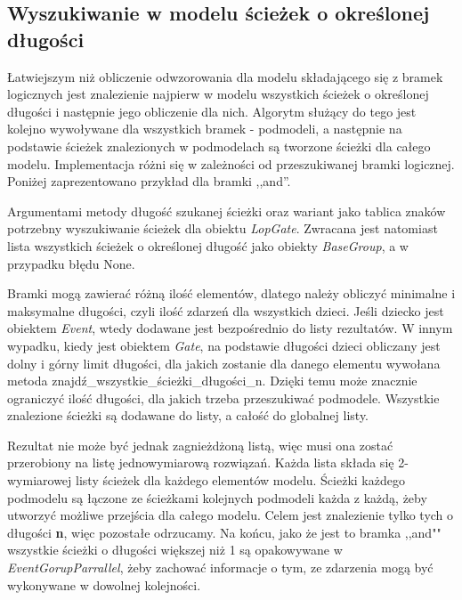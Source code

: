 \subsection{Wyszukiwanie w modelu ścieżek o określonej długości}

Łatwiejszym niż obliczenie odwzorowania dla modelu składającego się z bramek logicznych jest znalezienie najpierw w modelu wszystkich ścieżek o określonej długości i następnie jego obliczenie dla nich. Algorytm służący do tego jest kolejno wywoływane dla wszystkich bramek - podmodeli, a następnie na podstawie ścieżek znalezionych w podmodelach są tworzone ścieżki dla całego modelu. Implementacja różni się w zależności od przeszukiwanej bramki logicznej. Poniżej zaprezentowano przykład dla bramki ,,and''.  

Argumentami metody długość szukanej ścieżki oraz wariant jako tablica znaków potrzebny wyszukiwanie ścieżek dla obiektu \textit{LopGate}. Zwracana jest natomiast lista wszystkich ścieżek o określonej długość jako obiekty \textit{BaseGroup}, a w przypadku błędu None.

Bramki mogą zawierać różną ilość elementów, dlatego należy obliczyć minimalne i maksymalne długości, czyli ilość zdarzeń dla wszystkich dzieci. Jeśli dziecko jest obiektem \textit{Event}, wtedy dodawane jest bezpośrednio do listy rezultatów. W innym wypadku, kiedy jest obiektem \textit{Gate}, na podstawie długości dzieci obliczany jest dolny i górny limit długości, dla jakich zostanie dla danego elementu wywołana metoda znajdź{\_}wszystkie{\_}ścieżki{\_}długości{\_}n. Dzięki temu może znacznie ograniczyć ilość długości, dla jakich trzeba przeszukiwać podmodele. Wszystkie znalezione ścieżki są dodawane do listy, a całość do globalnej listy. 

Rezultat nie może być jednak zagnieżdżoną listą, więc musi ona zostać przerobiony na listę jednowymiarową rozwiązań. Każda lista składa się 2-wymiarowej listy ścieżek dla każdego elementów modelu. Ścieżki każdego podmodelu są łączone ze ścieżkami kolejnych podmodeli każda z każdą, żeby utworzyć możliwe przejścia dla całego modelu. Celem jest znalezienie tylko tych o długości \textbf{n}, więc pozostałe odrzucamy. Na końcu, jako że jest to bramka ,,and"" wszystkie ścieżki o długości większej niż 1 są opakowywane w \textit{EventGorupParrallel}, żeby zachować informacje o tym, ze zdarzenia mogą być wykonywane w dowolnej kolejności.

